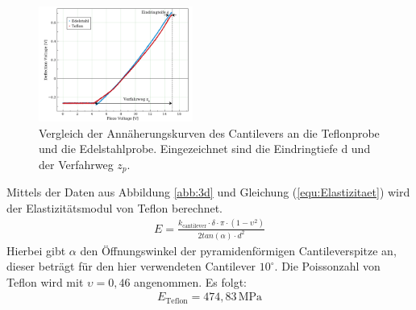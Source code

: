 \begin{figure}[hbtp]
	\centering
	\includegraphics[width=0.45\textwidth]{AFM_auswertung/elastizitaet.png}
	\caption{Vergleich der Annäherungskurven des Cantilevers an die Teflonprobe und die Edelstahlprobe. Eingezeichnet sind die Eindringtiefe d und der Verfahrweg $z_p$.}
	\label{abb:auf3c}
\end{figure}
Mittels der Daten aus Abbildung \ref{abb:3d} und Gleichung (\ref{equ:Elastizitaet}) wird der Elastizitätsmodul von Teflon berechnet.
\begin{align}
	E = \frac{k_{\text{cantilever}} \cdot \delta \cdot \pi \cdot \left( 1 - \upsilon^2 \right)}{2 tan(\alpha) \cdot d^2}
\label{equ:Elastizitaet}
\end{align}
Hierbei gibt $\alpha$ den Öffnungswinkel der pyramidenförmigen Cantileverspitze an, dieser betr\"agt f\"ur den hier verwendeten Cantilever $10^{\circ}$.
Die Poissonzahl von Teflon wird mit $\upsilon = 0,46$ angenommen.
Es folgt:
\begin{align*}
	E_{\text{Teflon}} = 474,83 \, \text{MPa}
\end{align*}
